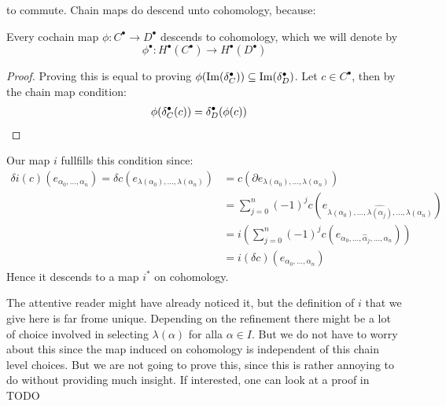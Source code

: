 to commute. Chain maps do descend unto cohomology, because:
\begin{lemma}
Every cochain map $\phi: C^\bullet \to D^\bullet$ descends to cohomology,
which we will denote by
\[	
	\phi^\bullet: H^\bullet(C^\bullet) \to H^\bullet(D^\bullet)
\]
\end{lemma}
\begin{proof}
Proving this is equal to proving $\phi(\operatorname{Im}(\delta_C^\bullet)) \subseteq \operatorname{Im}(\delta_D^\bullet)$.
Let $c \in C^\bullet$, then by the chain map condition:
\begin{align*}
	\phi(\delta_C^\bullet(c)) = \delta_D^\bullet(\phi(c)) & \qedhere
\end{align*}
\end{proof}

Our map $i$ fullfills this condition since:
\begin{align*}
	\delta i(c)(e_{\alpha_0, \dots, \alpha_n})
		= \delta c(e_{\lambda(\alpha_0), \dots, \lambda(\alpha_n)})
		&= c(\partial e_{\lambda(\alpha_0), \dots, \lambda(\alpha_n)}) \\
		&= \sum_{j = 0}^n (-1)^j c(e_{\lambda(\alpha_0), \dots, \hat{\lambda(\alpha_j)}, \dots, \lambda(\alpha_n)}) \\
		&= i\left(\sum_{j = 0}^n (-1)^j c(e_{\alpha_0, \dots, \hat{\alpha}_j, \dots, \alpha_n}) \right) \\
		&= i(\delta c) (e_{\alpha_0, \dots, \alpha_n})
\end{align*}
Hence it descends to a map $i^*$ on cohomology.

\begin{remark}
The attentive reader might have already noticed it, but the definition of $i$ that we give here
is far frome unique. Depending on the refinement there might be a lot of choice involved
in selecting $\lambda(\alpha)$ for alla $\alpha \in I$. But we do not have to worry about
this since the map induced on cohomology is independent of this chain level choices.
But we are not going to prove this, since this is rather annoying to do without providing much insight.
If interested, one can look at a proof in TODO
\end{remark}

